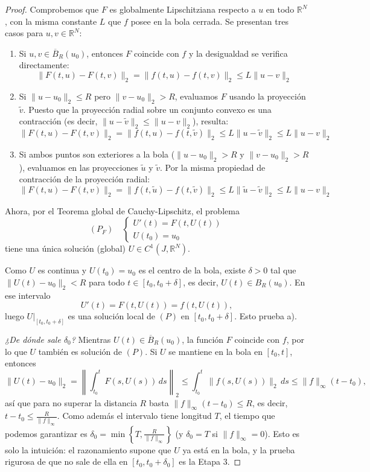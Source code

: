 \begin{proof}
    Comprobemos que $F$ es globalmente Lipschitziana respecto a $u$ en todo $\mathbb{R}^N$, con la misma constante $L$ que $f$ posee en la bola cerrada. Se presentan tres casos para $u, v \in \mathbb{R}^N$:
    \begin{enumerate}
        \item Si $u, v \in \overline{B}_R (u_0)$, entonces $F$ coincide con $f$ y la desigualdad se verifica directamente:
        \[
            \| F(t,u) - F(t,v) \|_2 = \| f(t,u) - f(t,v) \|_2 \leq L \| u - v \|_2
        \]
        \item Si $\| u - u_0 \|_2 \leq R$ pero $\| v - u_0 \|_2 > R$, evaluamos $F$ usando la proyección $\tilde{v}$. Puesto que la proyección radial sobre un conjunto convexo es una contracción (es decir, $\| u - \tilde{v} \|_2 \leq \| u - v \|_2$), resulta:
        \[
            \| F(t,u) - F(t,v) \|_2 = \| f(t,u) - f(t, \tilde{v}) \|_2 \leq L \| u - \tilde{v} \|_2 \leq L \| u - v \|_2
        \]
        \item Si ambos puntos son exteriores a la bola ($\| u - u_0 \|_2 > R$ y $\| v - u_0 \|_2 > R$), evaluamos en las proyecciones $\tilde{u}$ y $\tilde{v}$. Por la misma propiedad de contracción de la proyección radial:
        \[
            \| F(t,u) - F(t,v) \|_2 = \| f(t, \tilde{u}) - f(t, \tilde{v}) \|_2 \leq L \| \tilde{u} - \tilde{v} \|_2 \leq L \| u - v \|_2
        \]
    \end{enumerate}

    Ahora, por el Teorema global de Cauchy-Lipschitz, el problema
    \[
        (P_F) \quad \begin{cases}
            U'(t) = F(t, U(t)) \\
            U(t_0) = u_0
        \end{cases}
    \]
    tiene una única solución (global) $U \in C^1(J, \mathbb{R}^N)$.

    Como $U$ es continua y $U(t_0) = u_0$ es el centro de la bola, existe $\delta > 0$ tal que $\| U(t) - u_0 \|_2 < R$ para todo $t \in [t_0, t_0 + \delta]$, es decir, $U(t) \in B_R(u_0)$. En ese intervalo
    \[
        U'(t) = F(t, U(t)) = f(t, U(t)),
    \]
    luego $U|_{[t_0, t_0 + \delta]}$ es una solución local de $(P)$ en $[t_0, t_0 + \delta]$. Esto prueba a).

    \textit{¿De dónde sale $\delta_0$?} Mientras $U(t) \in \overline{B}_R(u_0)$, la función $F$ coincide con $f$, por lo que $U$ también es solución de $(P)$. Si $U$ se mantiene en la bola en $[t_0, t]$, entonces
    \[
        \| U(t) - u_0 \|_2 = \left\| \int_{t_0}^t F(s, U(s)) \, ds \right\|_2 \leq \int_{t_0}^t \| f(s, U(s)) \|_2 \, ds \leq \| f \|_\infty (t - t_0),
    \]
    así que para no superar la distancia $R$ basta $\| f \|_\infty (t - t_0) \leq R$, es decir, $t - t_0 \leq \frac{R}{\| f \|_\infty}$. Como además el intervalo tiene longitud $T$, el tiempo que podemos garantizar es $\delta_0 = \min \left\{ T, \frac{R}{\| f \|_\infty} \right\}$ (y $\delta_0 = T$ si $\| f \|_\infty = 0$). Esto es solo la intuición: el razonamiento supone que $U$ ya está en la bola, y la prueba rigurosa de que no sale de ella en $[t_0, t_0 + \delta_0]$ es la Etapa 3.


\end{proof}
